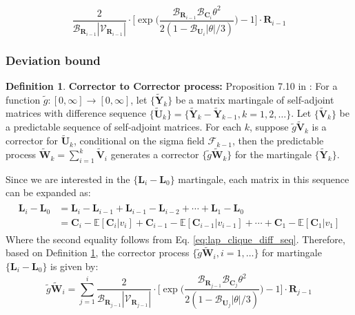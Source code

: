 \documentclass{article}
\def\mC{{\mathbf{C}}}
\def\mL{{\mathbf{L}}}
\def\mR{{\mathbf{R}}}
\def\mU{{\mathbf{U}}}
\def\mV{{\mathbf{V}}}
\def\mW{{\mathbf{W}}}
\def\mY{{\mathbf{Y}}}
\def\gV{{\mathcal{V}}}
\theoremstyle{plain}
\theoremstyle{definition}
\newtheorem{definition}[theorem]{Definition}
\theoremstyle{remark}
\begin{document}
\begin{equation}
\label{eq:composite_corrector}
\frac{2}{\mathcal{B}_{\mR_{i-1}}|\gV_{\mR_{i-1}}|} \cdot \bigg[ \exp\bigg( \frac{\mathcal{B}_{\mR_{i-1}}\mathcal{B}_{\mC_i} \theta^2}{2 (1 - \mathcal{B}_{\mU_i}|\theta|/3)} \bigg) - 1 \bigg]  \cdot \mR_{i-1}
\end{equation}

\subsubsection{Deviation bound}

\begin{definition}
\label{def:corrector_to_corrector_process}
\textbf{Corrector to Corrector process:} Proposition 7.10 in \citet{tropp2019matrix}: For a function $\widetilde{g} : [0, \infty] \to [0, \infty]$, let $\{\widetilde{\mY}_k\}$ be a matrix martingale of self-adjoint matrices with difference sequence $\{\widetilde{\mU}_k\} = \{\widetilde{\mY}_k - \widetilde{\mY}_{k-1} , k=1,2,\dots\}$. Let $\{\widetilde{\mV}_k\}$ be a predictable sequence of self-adjoint matrices. For each $k$, suppose $\widetilde{g}\widetilde{\mV}_k$ is a corrector for $\widetilde{\mU}_k$, conditional on the sigma field $\mathcal{F}_{k-1}$, then the predictable process $\widetilde{\mW}_k = \sum_{i=1}^k \widetilde{\mV}_i$ generates a corrector $\{\widetilde{g}\widetilde{\mW}_k\}$ for the martingale $\{\widetilde{\mY}_k\}$.
\end{definition}

Since we are interested in the $\{\mL_i - \mL_0\}$ martingale, each matrix in this sequence can be expanded as:
\begin{align*}
\begin{split}
    \mL_i -  \mL_0 &= \mL_i - \mL_{i-1} + \mL_{i-1} - \mL_{i-2} + \cdots + \mL_1 - \mL_0 \\
    &= \mC_i - \mathbb{E}[\mC_i|v_i] + \mC_{i-1} - \mathbb{E}[\mC_{i-1}|v_{i-1}] + \cdots + \mC_1 - \mathbb{E}[\mC_1|v_1]
\end{split}
\end{align*}
Where the second equality follows from Eq. \ref{eq:lap_clique_diff_seq}. Therefore, based on Definition \ref{def:corrector_to_corrector_process}, the corrector process $\{\widetilde{g}\widetilde{\mW}_i, i = 1, \dots\}$ for martingale $\{\mL_i - \mL_0\}$ is given by:
\begin{equation}
\label{eq:composite_corrector_process}
    \widetilde{g}\widetilde{\mW}_i = \sum_{j=1}^i \frac{2}{\mathcal{B}_{\mR_{j-1}}|\gV_{\mR_{j-1}}|} \cdot \bigg[ \exp\bigg( \frac{\mathcal{B}_{\mR_{j-1}}\mathcal{B}_{\mC_j} \theta^2}{2 (1 - \mathcal{B}_{\mU_j}|\theta|/3)} \bigg) - 1 \bigg]  \cdot \mR_{j-1}
\end{equation}
\end{document}
